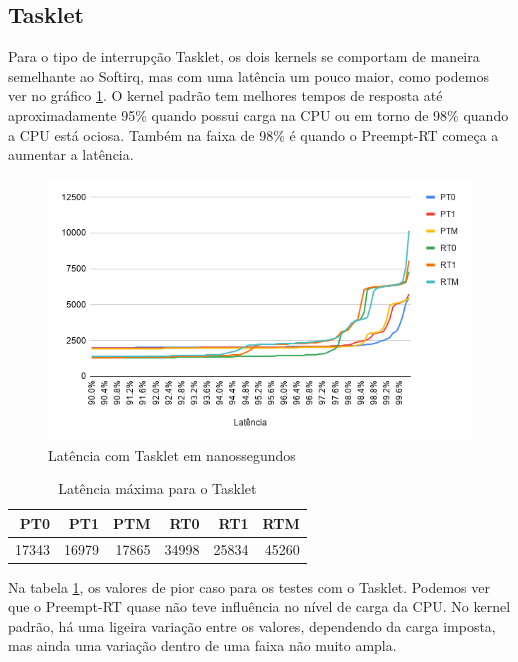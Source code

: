 \subsection{Tasklet}

Para o tipo de interrupção Tasklet, os dois kernels se comportam de maneira semelhante ao Softirq, mas com uma latência um pouco maior, como podemos ver no gráfico \ref{grafico:tasklet}. O kernel padrão tem melhores tempos de resposta até aproximadamente 95\% quando possui carga na CPU ou em torno de 98\% quando a CPU está ociosa. Também na faixa de 98\% é quando o Preempt-RT começa a aumentar a latência.

\begin{figure}[!p]
    \centering
    \includegraphics[width=\textwidth]{graficos/tasklet.png}
    \caption{Latência com Tasklet em nanossegundos}
    \label{grafico:tasklet}
\end{figure}

\begin{table}[!p]
    \centering
    \begin{center}
        \begin{tabular}{|r|r|r|r|r|r|}
            \toprule
                PT0 &    PT1 &    PTM &    RT0 &     RT1 &    RTM \\
            \midrule
                17343 &  16979 &  17865 & 34998 &  25834 &  45260  \\
            \bottomrule
        \end{tabular}
    \end{center}
    \caption{Latência máxima para o Tasklet}
    \label{table:max-tasklet}
\end{table}

Na tabela \ref{table:max-tasklet}, os valores de pior caso para os testes com o Tasklet. Podemos ver que o Preempt-RT quase não teve influência no nível de carga da CPU. No kernel padrão, há uma ligeira variação entre os valores, dependendo da carga imposta, mas ainda uma variação dentro de uma faixa não muito ampla.

